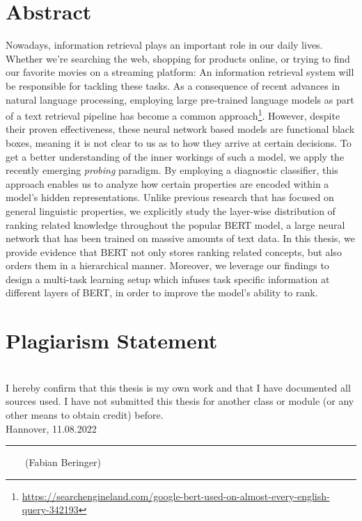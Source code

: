 \documentclass[headsepline]{scrreprt}
\newcommand{\handindate}{11.08.2022}
\newcommand{\ti}[1]{\textit{#1}}
\begin{document}


\chapter*{Abstract}
Nowadays, information retrieval plays an important role in our daily lives. Whether we're searching the web, shopping for products online, or trying to find our favorite movies on a streaming platform: An information retrieval system will be responsible for tackling these tasks. As a consequence of recent advances in natural language processing, employing large pre-trained language models as part of a text retrieval pipeline has become a common approach\footnote{\url{https://searchengineland.com/google-bert-used-on-almost-every-english-query-342193}}. However, despite their proven effectiveness, these neural network based models are functional black boxes, meaning it is not clear to us as to how they arrive at certain decisions. To get a better understanding of the inner workings of such a model, we apply the recently emerging \ti{probing} paradigm. By employing a diagnostic classifier, this approach enables us to analyze how certain properties are encoded within a model's hidden representations. Unlike previous research that has focused on general linguistic properties, we explicitly study the layer-wise distribution of ranking related knowledge throughout the popular BERT model, a large neural network that has been trained on massive amounts of text data. In this thesis, we provide evidence that BERT not only stores ranking related concepts, but also orders them in a hierarchical manner. Moreover, we leverage our findings to design a multi-task learning setup which infuses task specific information at different layers of BERT, in order to improve the model's ability to rank.

\tableofcontents










\chapter*{Plagiarism Statement}
\vfill
\mbox{} \\
{\large I hereby confirm that this thesis is my own work and that I have documented all sources used. I have not submitted this thesis for another class or module (or any
other means to obtain credit) before.}
\newline
\mbox{} \\
Hannover, \handindate \\
\vspace{4cm}
\hrule
\vspace{0.5cm}
$\qquad$(Fabian Beringer)

\listoffigures
{}
\listoftables
{}
\clearpage
{}
{}

\end{document}
